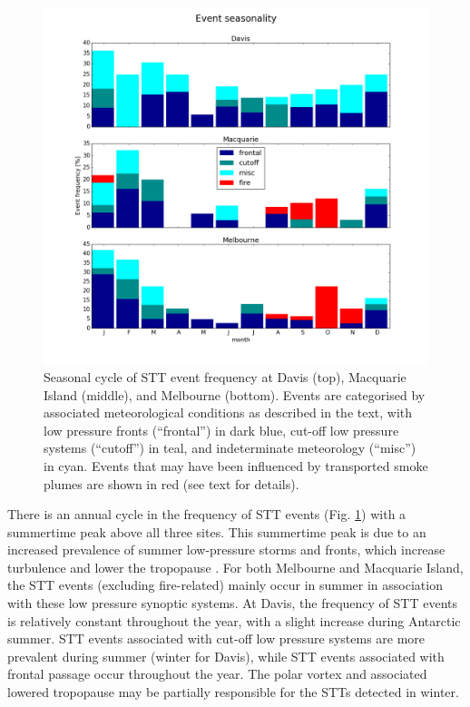 \documentclass{article}
\begin{document}
  \begin{figure}[!htbp]
    \begin{center}
    \includegraphics[width=1.0\columnwidth]{figures/summary_season.png}
    \caption{Seasonal cycle of STT event frequency at Davis (top), Macquarie Island (middle), and Melbourne (bottom).
      Events are categorised by associated meteorological conditions as described in the text, with low pressure fronts (“frontal”) in dark blue, cut-off low pressure systems (“cutoff”) in teal, and indeterminate meteorology (“misc”) in cyan. 
      Events that may have been influenced by transported smoke plumes are shown in red (see text for details).}
    \label{fig:SummarySeasonality}
    \end{center}
  \end{figure}
  
  There is an annual cycle in the frequency of STT events  (Fig. \ref{fig:SummarySeasonality}) with a summertime peak above all three sites.
  This summertime peak is due to an increased prevalence of summer low-pressure storms and fronts, which increase turbulence and lower the tropopause \citep{Reutter2015}.
  For both Melbourne and Macquarie Island, the STT events (excluding fire-related) mainly occur in summer in association with these low pressure synoptic systems.
  At Davis, the frequency of STT events is relatively constant throughout the year, with a slight increase during Antarctic summer.
  STT events associated with cut-off low pressure systems are more prevalent during summer (winter for Davis), while STT events associated with frontal passage occur throughout the year.
  The polar vortex and associated lowered tropopause may be partially responsible for the STTs detected in winter.
\end{document}
